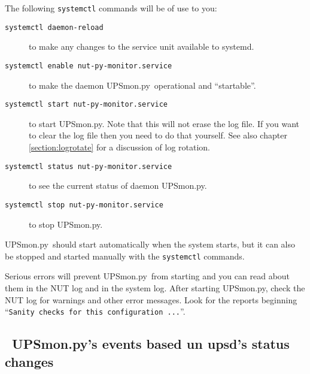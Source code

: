 \documentclass[12pt]{article}
\newlength{\headersep}\setlength{\headersep}{3mm}
\newcommand{\Hsep}{\hspace{\headersep}}
\newcommand{\newcolumn}{\vfill\eject}
\newcommand{\upsd}{\mbox{\textcolor{UPSDCOLOUR}{upsd}}}
\newcommand{\UPSmon}{\mbox{\textcolor{UPSMONCOLOUR}{UPSmon.py}}}
\begin{document}
The following \texttt{systemctl} commands will be of use to you:

\begin{description}

\item[\texttt{systemctl daemon-reload}] to make any changes to the service
  unit available to systemd.
\item[\texttt{systemctl enable nut-py-monitor.service}] to make the daemon
  \UPSmon\ operational and ``startable''.
\item[\texttt{systemctl start nut-py-monitor.service}] to start \UPSmon.  Note
  that this will not erase the log file.  If you want to clear the log file
  then you need to do that yourself. See also chapter \ref{section:logrotate}
  for a discussion of log rotation.
\item[\texttt{systemctl status nut-py-monitor.service}] to see the current
  status of daemon \UPSmon.
\item[\texttt{systemctl stop nut-py-monitor.service}] to stop \UPSmon.

\end{description}

\UPSmon\ should start automatically when the system starts, but it can also
be stopped and started manually with the \texttt{systemctl} commands.

Serious errors will prevent \UPSmon\ from starting and you can read about them
in the NUT log and in the system log.  After starting \UPSmon, check the NUT
log for warnings and other error messages.  Look for the reports beginning
``\texttt{Sanity checks for this configuration ...}''.

\vspace*{\fill}

\begin{center}
\end{center}

\vspace*{\fill}

\newcolumn
\subsection{\Hsep\ \UPSmon's events based un \upsd's status changes}\label{section:stch}
\end{document}
